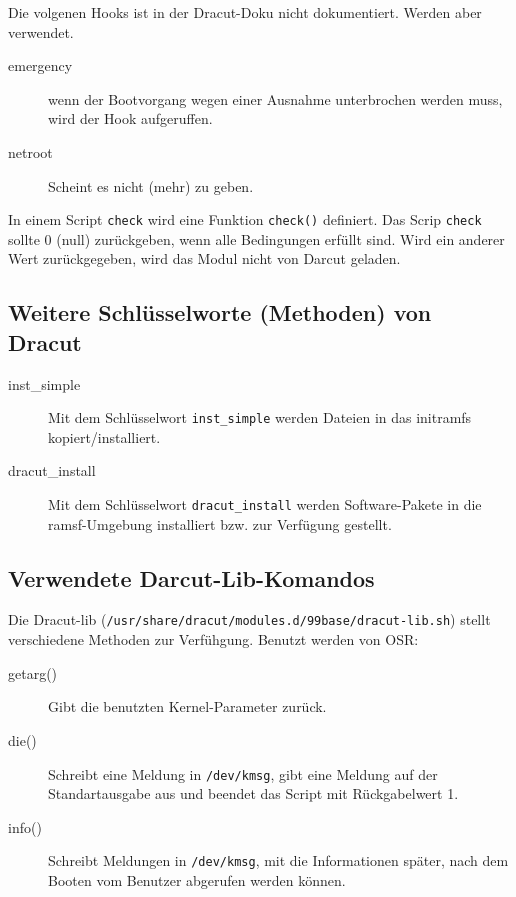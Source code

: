 \documentclass[10pt,a4paper]{article}
\begin{document}
Die volgenen Hooks ist in der Dracut-Doku nicht dokumentiert. Werden aber verwendet.

\begin{description}
 \item[emergency] wenn der Bootvorgang wegen einer Ausnahme unterbrochen werden muss, wird der Hook aufgeruffen.
 \item[netroot] Scheint es nicht (mehr) zu geben.
\end{description}

In einem Script \texttt{check} wird eine Funktion \texttt{check()} definiert. Das Scrip \texttt{check} sollte 0 (null) zurückgeben, wenn alle Bedingungen erfüllt sind. Wird ein anderer Wert zurückgegeben, wird das Modul nicht von Darcut geladen.

\subsection{Weitere Schlüsselworte (Methoden) von Dracut}

\begin{description}
 \item[inst\_simple] Mit dem Schlüsselwort \texttt{inst\_simple} werden Dateien in das initramfs kopiert/installiert.
 \item[dracut\_install] Mit dem Schlüsselwort \texttt{dracut\_install} werden Software-Pakete in die ramsf-Umgebung installiert bzw. zur Verfügung gestellt.
 \end{description}
 
\subsection{Verwendete Darcut-Lib-Komandos}

Die Dracut-lib (\texttt{/usr/share/dracut/modules.d/99base/dracut-lib.sh}) stellt verschiedene Methoden zur Verfühgung. Benutzt werden von OSR:

\begin{description}
 \item [getarg()] Gibt die benutzten Kernel-Parameter zurück.
 \item [die()] Schreibt eine Meldung in \texttt{/dev/kmsg}, gibt eine Meldung auf der Standartausgabe aus und beendet das Script mit Rückgabelwert 1.
 \item [info()] Schreibt Meldungen in  \texttt{/dev/kmsg}, mit die Informationen später, nach dem Booten vom Benutzer abgerufen werden können.

\end{description}
\end{document}

